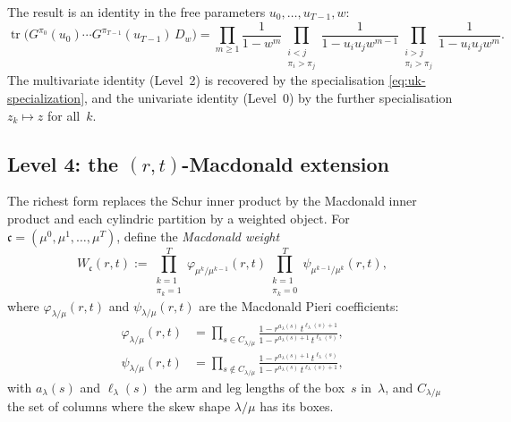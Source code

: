 \documentclass[11pt]{article}
\theoremstyle{plain}
\theoremstyle{definition}
\begin{document}
The result is an identity in the free parameters $u_0, \ldots, u_{T-1}, w$:
\begin{equation}
  \operatorname{tr}\!\bigl(
  G^{\pi_0}(u_0) \cdots G^{\pi_{T-1}}(u_{T-1})\, D_w
  \bigr)
  = \prod_{m \geq 1} \frac{1}{1 - w^m}
  \prod_{\substack{i < j \\ \pi_i > \pi_j}}
    \frac{1}{1 - u_i u_j w^{m-1}}
  \prod_{\substack{i > j \\ \pi_i > \pi_j}}
    \frac{1}{1 - u_i u_j w^m}.
  \label{eq:borodin-trace}
\end{equation}
The multivariate identity (Level~2) is recovered by the specialisation
\eqref{eq:uk-specialization}, and the univariate identity (Level~0) by
the further specialisation $z_k \mapsto z$ for all~$k$.


\subsection{Level 4: the $(r,t)$-Macdonald extension}

The richest form replaces the Schur inner product by the Macdonald inner
product and each cylindric partition by a weighted object.  For
$\mathfrak{c} = (\mu^0, \mu^1, \ldots, \mu^T)$, define the
\emph{Macdonald weight}
\begin{equation}
  W_{\mathfrak{c}}(r,t)
  := \prod_{\substack{k = 1 \\ \pi_k = 1}}^{T}
     \varphi_{\mu^k / \mu^{k-1}}(r,t)
     \prod_{\substack{k = 1 \\ \pi_k = 0}}^{T}
     \psi_{\mu^{k-1} / \mu^k}(r,t),
  \label{eq:Wc-def}
\end{equation}
where $\varphi_{\lambda/\mu}(r,t)$ and $\psi_{\lambda/\mu}(r,t)$ are the
Macdonald Pieri coefficients:
\begin{align}
  \varphi_{\lambda/\mu}(r,t)
  &= \prod_{s \in C_{\lambda/\mu}}
     \frac{1 - r^{a_\lambda(s)}\, t^{\ell_\lambda(s)+1}}
          {1 - r^{a_\lambda(s)+1}\, t^{\ell_\lambda(s)}},
  \label{eq:phi-def} \\
  \psi_{\lambda/\mu}(r,t)
  &= \prod_{s \notin C_{\lambda/\mu}}
     \frac{1 - r^{a_\lambda(s)+1}\, t^{\ell_\lambda(s)}}
          {1 - r^{a_\lambda(s)}\, t^{\ell_\lambda(s)+1}},
  \label{eq:psi-def}
\end{align}
with $a_\lambda(s)$ and $\ell_\lambda(s)$ the arm and leg lengths of the
box~$s$ in~$\lambda$, and $C_{\lambda/\mu}$ the set of columns where the
skew shape $\lambda/\mu$ has its boxes.
\end{document}
